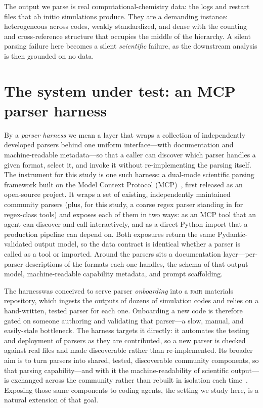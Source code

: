 \documentclass{article}
\newif\ifshowtheme\showthemefalse
\newcommand{\theme}[1]{\ifshowtheme{\normalfont\sffamily\footnotesize\color{gray}[\,#1\,]\ }\fi}
\newif\ifblind\blindtrue
\begin{document}
\theme{test case}The output we parse is real computational-chemistry data: the logs
and restart files that ab initio simulations produce. They are a demanding instance:
heterogeneous across codes, weakly standardized, and dense with the counting
and cross-reference structure that occupies the middle of the hierarchy. A silent
parsing failure here becomes a silent \emph{scientific} failure, as the downstream
analysis is then grounded on no data.

\section{The system under test: an MCP parser harness}

By a \emph{parser harness} we mean a layer that wraps a collection of independently
developed parsers behind one uniform interface---with documentation and machine-readable
metadata---so that a caller can discover which parser handles a given format, select it,
and invoke it without re-implementing the parsing itself. The instrument for this study
is one such harness\ifblind\else, \emph{Parse Patrol}\fi: a dual-mode scientific parsing
framework built on the Model Context Protocol (MCP)~\citep{mcp}, first released as
\ifblind an open-source project\else part of a community hackathon on language-model
applications in materials science and chemistry~\citep{hackathon2025}\fi.
It wraps a set of existing, independently maintained community parsers (plus, for this
study, a coarse regex parser standing in for regex-class tools) and exposes each
of them in two ways: as an MCP tool that an agent can discover and call
interactively, and as a direct Python import that a production pipeline can depend on. Both exposures return
the same Pydantic-validated output model, so the data contract is identical whether a
parser is called as a tool or imported.
Around the parsers sits a documentation layer---per-parser descriptions of the formats
each one handles, the schema of that output model, machine-readable capability metadata,
and prompt scaffolding.

\ifblind The harness\else \emph{Parse Patrol}\fi was conceived to serve parser
\emph{onboarding} into \ifblind a \textsc{fair} materials repository\else NOMAD~\citep{draxl2019nomad}\fi,
which ingests the outputs of dozens of simulation codes and relies on a
hand-written, tested parser for each one. Onboarding a new code is therefore gated on
someone authoring and validating that parser---a slow, manual, and easily-stale
bottleneck. The harness targets it directly: it automates the testing and deployment of
parsers as they are contributed, so a new parser is checked against real files and made
discoverable rather than re-implemented. Its broader aim is to turn parsers into shared,
tested, discoverable community components, so that parsing capability---and with it the
machine-readability of scientific output---is exchanged across the community rather than
rebuilt in isolation each time~\citep{ghiringhelli2023metadata}. Exposing those same
components to coding agents, the setting we study here, is a natural extension of that
goal.
\end{document}
